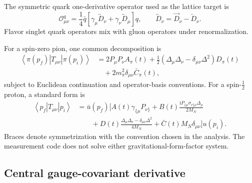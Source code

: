 \documentclass[11pt,a4paper]{article}
\numberwithin{equation}{section}
\newcommand{\ii}{\mathrm{i}}
\newcommand{\avg}[1]{\left\langle #1\right\rangle}
\newcommand{\cO}{\mathcal{O}}
\newcommand{\Dlr}{\overleftrightarrow D}
\begin{document}
The symmetric quark one-derivative operator used as the lattice target is
\begin{equation}
 \cO_{\mu\nu}^q
 =\frac14\bar q
 \left[
 \gamma_\mu\Dlr_\nu+\gamma_\nu\Dlr_\mu
 \right]q,
 \qquad
 \Dlr_\nu=\overrightarrow D_\nu-\overleftarrow D_\nu.
 \label{eq:quark-EMT}
\end{equation}
Flavor singlet quark operators mix with gluon operators under
renormalization.

For a spin-zero pion, one common decomposition is
\begin{align}
 \avg{\pi(p_f)|T_{\mu\nu}|\pi(p_i)}
 &=
 2P_\mu P_\nu A_\pi(t)
 +\frac12\left(
 \Delta_\mu\Delta_\nu-\delta_{\mu\nu}\Delta^2
 \right)D_\pi(t)
 \nonumber\\
 &\quad
 +2m_\pi^2\delta_{\mu\nu}\bar C_\pi(t),
 \label{eq:pion-EMT-decomposition}
\end{align}
subject to Euclidean continuation and operator-basis conventions.  For a
spin-\(\tfrac12\) proton, a standard form is
\begin{align}
 \avg{p_f|T_{\mu\nu}|p_i}
 &=\bar u(p_f)
 \Bigg[
 A(t)\gamma_{\{\mu}P_{\nu\}}
 +B(t)\frac{\ii P_{\{\mu}\sigma_{\nu\}\rho}\Delta_\rho}{2M_N}
 \nonumber\\
 &\qquad
 +D(t)\frac{\Delta_\mu\Delta_\nu-\delta_{\mu\nu}\Delta^2}{4M_N}
 +\bar C(t)M_N\delta_{\mu\nu}
 \Bigg]u(p_i).
 \label{eq:proton-EMT-decomposition}
\end{align}
Braces denote symmetrization with the convention chosen in the analysis.
The measurement code does not solve either gravitational-form-factor system.

\subsection{Central gauge-covariant derivative}
\end{document}
